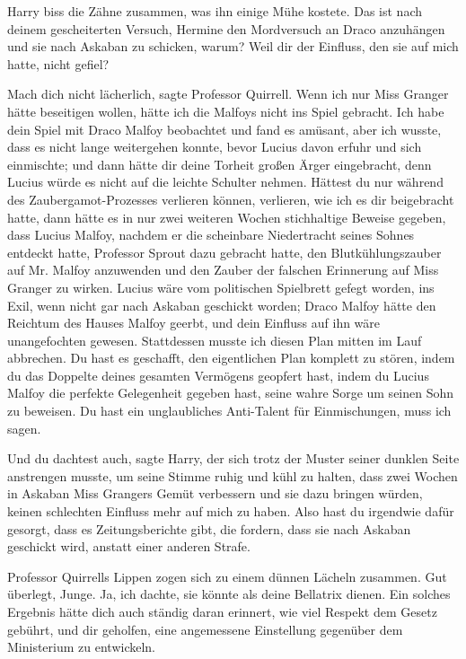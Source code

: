 Harry biss die Zähne zusammen, was ihn einige Mühe kostete. \glqq{}Das ist nach
deinem gescheiterten Versuch, Hermine den Mordversuch an Draco anzuhängen und
sie nach Askaban zu schicken, warum? Weil dir der Einfluss, den sie auf mich
hatte, nicht gefiel?\grqq{}

\glqq{}Mach dich nicht lächerlich\grqq{}, sagte Professor Quirrell. \glqq{}Wenn
ich nur Miss Granger hätte beseitigen wollen, hätte ich die Malfoys nicht ins
Spiel gebracht. Ich habe dein Spiel mit Draco Malfoy beobachtet und fand es
amüsant, aber ich wusste, dass es nicht lange weitergehen konnte, bevor Lucius
davon erfuhr und sich einmischte; und dann hätte dir deine Torheit großen Ärger
eingebracht, denn Lucius würde es nicht auf die leichte Schulter nehmen. Hättest
du nur während des Zaubergamot-Prozesses verlieren können, verlieren, wie ich es
dir beigebracht hatte, dann hätte es in nur zwei weiteren Wochen stichhaltige
Beweise gegeben, dass Lucius Malfoy, nachdem er die scheinbare Niedertracht
seines Sohnes entdeckt hatte, Professor Sprout dazu gebracht hatte, den
Blutkühlungszauber auf Mr. Malfoy anzuwenden und den Zauber der falschen
Erinnerung auf Miss Granger zu wirken. Lucius wäre vom politischen Spielbrett
gefegt worden, ins Exil, wenn nicht gar nach Askaban geschickt worden; Draco
Malfoy hätte den Reichtum des Hauses Malfoy geerbt, und dein Einfluss auf ihn
wäre unangefochten gewesen. Stattdessen musste ich diesen Plan mitten im Lauf
abbrechen. Du hast es geschafft, den eigentlichen Plan komplett zu stören, indem
du das Doppelte deines gesamten Vermögens geopfert hast, indem du Lucius Malfoy
die perfekte Gelegenheit gegeben hast, seine wahre Sorge um seinen Sohn zu
beweisen. Du hast ein unglaubliches Anti-Talent für Einmischungen, muss ich
sagen.\grqq{}

\glqq{}Und du dachtest auch\grqq{}, sagte Harry, der sich trotz der Muster seiner
dunklen Seite anstrengen musste, um seine Stimme ruhig und kühl zu halten, \glqq{}
dass zwei Wochen in Askaban Miss Grangers Gemüt verbessern und sie dazu bringen
würden, keinen schlechten Einfluss mehr auf mich zu haben. Also hast du
irgendwie dafür gesorgt, dass es Zeitungsberichte gibt, die fordern, dass sie
nach Askaban geschickt wird, anstatt einer anderen Strafe.\grqq{}

Professor Quirrells Lippen zogen sich zu einem dünnen Lächeln zusammen. \glqq{}
Gut überlegt, Junge. Ja, ich dachte, sie könnte als deine Bellatrix dienen. Ein
solches Ergebnis hätte dich auch ständig daran erinnert, wie viel Respekt dem
Gesetz gebührt, und dir geholfen, eine angemessene Einstellung gegenüber dem
Ministerium zu entwickeln.\grqq{}

